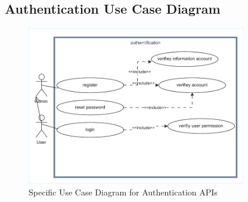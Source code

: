 \subsection{Authentication Use Case Diagram}
\begin{figure}[H]
    \centering
    \includegraphics[width=0.85\textwidth]{chapters/chapter 3/figures/AuthUseCase.drawio_cropped.pdf}
    \caption{Specific Use Case Diagram for Authentication APIs}
    \label{fig:sprint0_usecase}
\end{figure}

